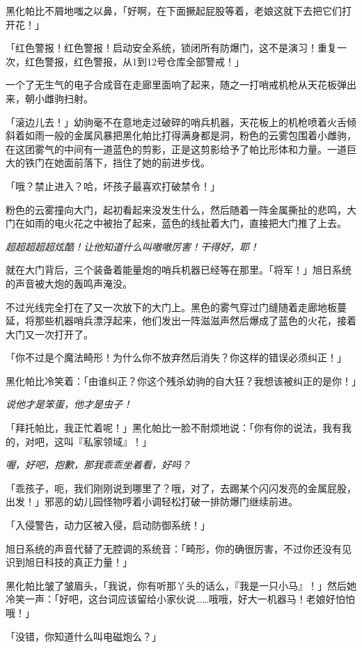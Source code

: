 黑化帕比不屑地嗤之以鼻，「好啊，在下面撅起屁股等着，老娘这就下去把它们打开花！」

「{\mt 红色警报！红色警报！启动安全系统，锁闭所有防爆门，这不是演习！重复一次，红色警报，红色警报，从1到12号仓库全部警戒！}」

一个了无生气的电子合成音在走廊里面响了起来，随之一打哨戒机枪从天花板弹出来，朝小雌驹扫射。

「滚边儿去！」幼驹毫不在意地走过破碎的哨兵机器，天花板上的机枪喷着火舌倾斜着如雨一般的金属风暴把黑化帕比打得满身都是洞，粉色的云雾包围着小雌驹，在这团雾气的中间有一道蓝色的剪影，正是这剪影给予了帕比形体和力量。一道巨大的铁门在她面前落下，挡住了她的前进步伐。

「哦？禁止进入？哈，坏孩子最喜欢打破禁令！」

粉色的云雾撞向大门，起初看起来没发生什么，然后随着一阵金属撕扯的悲鸣，大门在如雨的电火花之中被抬了起来，蓝色的线扯着大门，直接把大门推了上去。

\emph{超超超超超炫酷！让他知道什么叫嗷嗷厉害！干得好，耶！}

就在大门背后，三个装备着能量炮的哨兵机器已经等在那里。「将军！」旭日系统的声音被大炮的轰鸣声淹没。

不过光线完全打在了又一次放下的大门上。黑色的雾气穿过门缝随着走廊地板蔓延，将那些机器哨兵漂浮起来，他们发出一阵滋滋声然后爆成了蓝色的火花，接着大门又一次打开了。

「你不过是个魔法畸形！为什么你不放弃然后消失？你这样的错误必须纠正！」

黑化帕比冷笑着：「由谁纠正？你这个残杀幼驹的自大狂？我想该被纠正的是你！」

\emph{说他才是笨蛋，他才是虫子！}

「拜托帕比，我正忙着呢！」黑化帕比一脸不耐烦地说：「你有你的说法，我有我的，对吧，这叫『私家领域』！」

\emph{喔，好吧，抱歉，那我乖乖坐着看，好吗？}

「乖孩子，呃，我们刚刚说到哪里了？哦，对了，去踢某个闪闪发亮的金属屁股，出发！」邪恶的幼儿园怪物哼着小调轻松打破一排防爆门继续前进。

「{\mt 入侵警告，动力区被入侵，启动防御系统！}」

旭日系统的声音代替了无腔调的系统音：「畸形，你的确很厉害，不过你还没有见识到旭日科技的真正力量！」

黑化帕比皱了皱眉头，「我说，你有听那丫头的话么，『我是一只小马』！」然后她冷笑一声：「好吧，这台词应该留给小家伙说……哦哦，好大一机器马！老娘好怕怕哦！」

「没错，你知道什么叫电磁炮么？」

